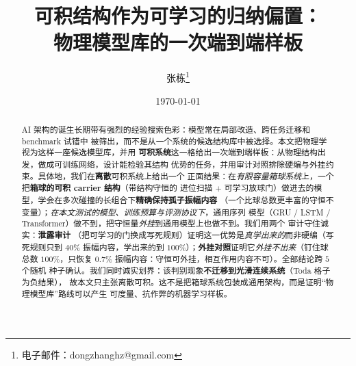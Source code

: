 \documentclass[11pt]{article}
\title{可积结构作为可学习的归纳偏置：\\
       物理模型库的一次端到端样板}
\author{张栋\thanks{电子邮件：dongzhanghz@gmail.com}}
\date{\today}
\theoremstyle{definition}
\theoremstyle{plain}
\begin{document}
\maketitle

\newcommand{\amp}{\mathrm{amp}}


\begin{abstract}
\noindent
AI 架构的诞生长期带有强烈的经验搜索色彩：模型常在局部改造、跨任务迁移和 benchmark 试错中
被筛出，而不是从一个系统的候选结构库中被选择。本文把物理学视为这样一座候选模型库，并用
\textbf{可积系统}这一格给出一次端到端样板：从物理结构出发，做成可训练网络，设计能检验其结构
优势的任务，并用审计对照排除硬编与外挂约束。具体地，我们在\textbf{离散}可积系统上给出一个
正面结果：在\emph{有限容量箱球系统}上，一个把\textbf{箱球的可积 carrier 结构}（带结构守恒的
进位扫描 $+$ 可学习放球门）做进去的模型，学会在多次碰撞的长组合下\textbf{精确保持孤子振幅内容}
（一个比球总数更丰富的守恒不变量）；\emph{在本文测试的模型、训练预算与评测协议下}，通用序列
模型（GRU / LSTM / Transformer）做不到，把守恒量\emph{外挂}到通用模型上也做不到。我们用两个
审计守住诚实：\textbf{泄露审计}
（把可学习的门换成写死规则）证明这一优势是\emph{真学出来的}而非硬编（写死规则只到 $40\%$
振幅内容，学出来的到 $100\%$）；\textbf{外挂对照}证明它\emph{外挂不出来}（钉住球总数
$100\%$，只恢复 $0.7\%$ 振幅内容：守恒可外挂，相互作用内容不可）。全部结论跨 $5$ 个随机
种子确认。我们同时诚实划界：该判别现象\textbf{不迁移到光滑连续系统}（Toda 格子为负结果），
故本文只主张离散可积。这不是把箱球系统包装成通用架构，而是证明“物理模型库”路线可以产生
可度量、抗作弊的机器学习样板。
\end{abstract}
\end{document}
